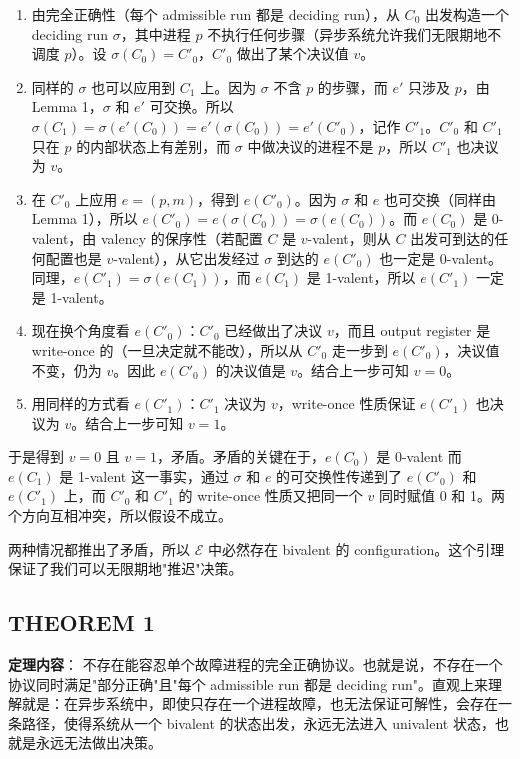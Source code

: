 \documentclass[12pt, a4paper]{ctexart}
\theoremstyle{definition}
\theoremstyle{plain}
\theoremstyle{remark}
\begin{document}
\begin{enumerate}
    \item 由完全正确性（每个 admissible run 都是 deciding run），从 $C_0$ 出发构造一个 deciding run $\sigma$，其中进程 $p$ 不执行任何步骤（异步系统允许我们无限期地不调度 $p$）。设 $\sigma(C_0) = C'_0$，$C'_0$ 做出了某个决议值 $v$。
    \item 同样的 $\sigma$ 也可以应用到 $C_1$ 上。因为 $\sigma$ 不含 $p$ 的步骤，而 $e'$ 只涉及 $p$，由 Lemma 1，$\sigma$ 和 $e'$ 可交换。所以 $\sigma(C_1) = \sigma(e'(C_0)) = e'(\sigma(C_0)) = e'(C'_0)$，记作 $C'_1$。$C'_0$ 和 $C'_1$ 只在 $p$ 的内部状态上有差别，而 $\sigma$ 中做决议的进程不是 $p$，所以 $C'_1$ 也决议为 $v$。
    \item 在 $C'_0$ 上应用 $e = (p, m)$，得到 $e(C'_0)$。因为 $\sigma$ 和 $e$ 也可交换（同样由 Lemma 1），所以 $e(C'_0) = e(\sigma(C_0)) = \sigma(e(C_0))$。而 $e(C_0)$ 是 0-valent，由 valency 的保序性（若配置 $C$ 是 $v$-valent，则从 $C$ 出发可到达的任何配置也是 $v$-valent），从它出发经过 $\sigma$ 到达的 $e(C'_0)$ 也一定是 0-valent。同理，$e(C'_1) = \sigma(e(C_1))$，而 $e(C_1)$ 是 1-valent，所以 $e(C'_1)$ 一定是 1-valent。
    \item 现在换个角度看 $e(C'_0)$：$C'_0$ 已经做出了决议 $v$，而且 output register 是 write-once 的（一旦决定就不能改），所以从 $C'_0$ 走一步到 $e(C'_0)$，决议值不变，仍为 $v$。因此 $e(C'_0)$ 的决议值是 $v$。结合上一步可知 $v = 0$。
    \item 用同样的方式看 $e(C'_1)$：$C'_1$ 决议为 $v$，write-once 性质保证 $e(C'_1)$ 也决议为 $v$。结合上一步可知 $v = 1$。
\end{enumerate}

于是得到 $v = 0$ 且 $v = 1$，矛盾。矛盾的关键在于，$e(C_0)$ 是 0-valent 而 $e(C_1)$ 是 1-valent 这一事实，通过 $\sigma$ 和 $e$ 的可交换性传递到了 $e(C'_0)$ 和 $e(C'_1)$ 上，而 $C'_0$ 和 $C'_1$ 的 write-once 性质又把同一个 $v$ 同时赋值 0 和 1。两个方向互相冲突，所以假设不成立。

两种情况都推出了矛盾，所以 $\mathcal{E}$ 中必然存在 bivalent 的 configuration。这个引理保证了我们可以无限期地"推迟"决策。


\subsection{THEOREM 1}

\textbf{定理内容}：
不存在能容忍单个故障进程的完全正确协议。也就是说，不存在一个协议同时满足"部分正确"且"每个 admissible run 都是 deciding run"。直观上来理解就是：在异步系统中，即使只存在一个进程故障，也无法保证可解性，会存在一条路径，使得系统从一个 bivalent 的状态出发，永远无法进入 univalent 状态，也就是永远无法做出决策。
\end{document}
